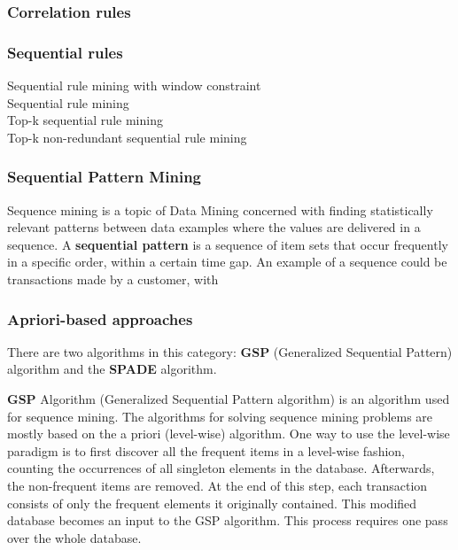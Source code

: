 \subsubsection*{Correlation rules}

\subsubsection*{Sequential rules}

\begin{description}
\item[Sequential rule mining with window constraint]
\item[Sequential rule mining]
\item[Top-k sequential rule mining]
\item[Top-k non-redundant sequential rule mining]
\end{description}

\subsubsection{Sequential Pattern Mining}
Sequence mining is a topic of Data Mining concerned with finding statistically relevant patterns between data examples where the values are delivered in a sequence. A \textbf{sequential pattern} is a sequence of item sets that occur frequently in a specific order, within a certain time gap. An example of a sequence could be transactions made by a customer, with

\subsubsection*{Apriori-based approaches} 

There are two algorithms in this category: \textbf{GSP} (Generalized Sequential Pattern) algorithm and the \textbf{SPADE} algorithm. 

\textbf{GSP} Algorithm (Generalized Sequential Pattern algorithm) is an algorithm used for sequence mining. The algorithms for solving sequence mining problems are mostly based on the a priori (level-wise) algorithm. One way to use the level-wise paradigm is to first discover all the frequent items in a level-wise fashion, counting the occurrences of all singleton elements in the database. Afterwards, the non-frequent items are removed. At the end of this step, each transaction consists of only the frequent elements it originally contained. This modified database becomes an input to the GSP algorithm. This process requires one pass over the whole database. 

